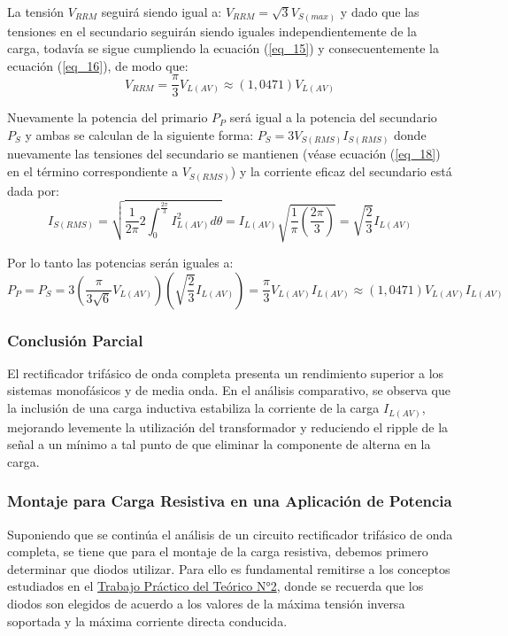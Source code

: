 \documentclass[12pt,a4paper]{article}
\begin{document}
La tensión $V_{RRM}$ seguirá siendo igual a: $V_{RRM} = \sqrt{3} V_{S(max)}$ y dado que las tensiones en el secundario seguirán siendo iguales independientemente de la carga, todavía se sigue cumpliendo la ecuación (\ref{eq_15}) y consecuentemente la ecuación (\ref{eq_16}), de modo que:
\begin{equation}
    V_{RRM} = \frac{\pi}{3} V_{L(AV)} \approx (1,0471)V_{L(AV)}
    \label{eq_23}
\end{equation}

Nuevamente la potencia del primario $P_{P}$ será igual a la potencia del secundario $P_{S}$ y ambas se calculan de la siguiente forma: $P_{S} = 3 V_{S(RMS)} I_{S(RMS)}$ donde nuevamente las tensiones del secundario se mantienen (véase ecuación (\ref{eq_18}) en el término correspondiente a $V_{S(RMS)}$) y la corriente eficaz del secundario está dada por:
\begin{equation}
    I_{S(RMS)} = \sqrt{\frac{1}{2\pi} 2\int_{0}^{\frac{2\pi}{3}} I^{2}_{L(AV)}d\theta} = I_{L(AV)} \sqrt{\frac{1}{\pi} \left(\frac{2\pi}{3}\right)}  = \sqrt{\frac{2}{3}} I_{L(AV)}
    \label{eq_24}
\end{equation}

Por lo tanto las potencias serán iguales a:
\begin{equation}
    P_{P} = P_{S} = 3 \left(\frac{\pi}{3\sqrt{6}} V_{L(AV)}\right) \left(\sqrt{\frac{2}{3}} I_{L(AV)}\right) = \frac{\pi}{3} V_{L(AV)} I_{L(AV)} \approx (1,0471) V_{L(AV)} I_{L(AV)}
    \label{eq_25}
\end{equation}



\subsubsection{Conclusión Parcial}
El rectificador trifásico de onda completa presenta un rendimiento superior a los sistemas monofásicos y de media onda. En el análisis comparativo, se observa que la inclusión de una carga inductiva estabiliza la corriente de la carga $I_{L(AV)}$, mejorando levemente la utilización del transformador y reduciendo el ripple de la señal a un mínimo a tal punto de que eliminar la componente de alterna en la carga.



\subsubsection{Montaje para Carga Resistiva en una Aplicación de Potencia}
Suponiendo que se continúa el análisis de un circuito rectificador trifásico de onda completa, se tiene que para el montaje de la carga resistiva, debemos primero determinar que diodos utilizar. Para ello es fundamental remitirse a los conceptos estudiados en el \href{https://github.com/ErnestMonja/Electronica-Industrial/blob/main/TPT2%20%20%20-%20Diodos%20de%20Potencia/Monja_TPT2_EI2026.pdf}{Trabajo Práctico del Teórico N°2}, donde se recuerda que los diodos son elegidos de acuerdo a los valores de la máxima tensión inversa soportada y la máxima corriente directa conducida. 
\end{document}
